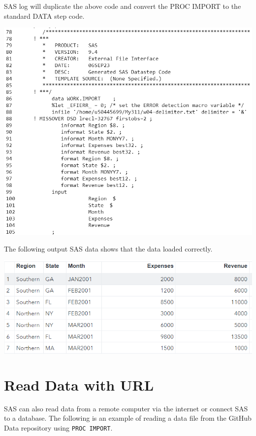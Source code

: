 \documentclass[
]{book}
\begin{document}
SAS log will duplicate the above code and convert the PROC IMPORT to the standard DATA step code.

\begin{center}\includegraphics[width=1\linewidth]{img04/w04-ImportLog} \end{center}

The following output SAS data shows that the data loaded correctly.

\begin{center}\includegraphics[width=1\linewidth]{img04/w04-PROCIMPORToutput-data} \end{center}

\hypertarget{read-data-with-url}{%
\section{Read Data with URL}\label{read-data-with-url}}

SAS can also read data from a remote computer via the internet or connect SAS to a database. The following is an example of reading a data file from the GitHub Data repository using \texttt{PROC\ IMPORT}.
\end{document}
